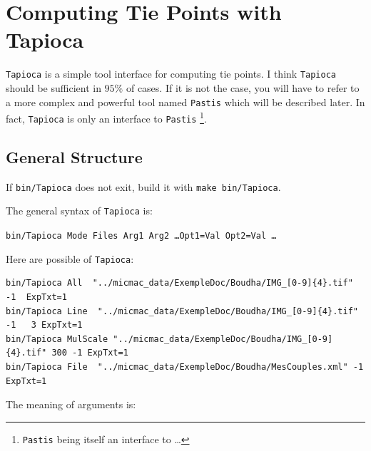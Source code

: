 \section{Computing Tie Points with Tapioca}

{\tt Tapioca} is a simple tool interface for computing tie points.
I think {\tt Tapioca}  should be sufficient in $95\%$ of cases.
If it is not the case, you will have to refer to a more complex and powerful
tool named {\tt Pastis} which will be described later.
In fact, {\tt Tapioca} is only an interface to {\tt Pastis}
\footnote{{\tt Pastis}  being itself an interface to \SiftPP \dots}.

\label{Tapioca}


\subsection{General Structure}

If {\tt bin/Tapioca} does not exit, build it with {\tt make bin/Tapioca}.

The general syntax of {\tt Tapioca} is:

\begin{center}
   {\tt bin/Tapioca   Mode  Files  Arg1 Arg2  \dots Opt1=Val Opt2=Val \dots}
\end{center}

Here are possible  of {\tt Tapioca}:

{\scriptsize
\begin{verbatim}
bin/Tapioca All  "../micmac_data/ExempleDoc/Boudha/IMG_[0-9]{4}.tif" -1  ExpTxt=1
bin/Tapioca Line  "../micmac_data/ExempleDoc/Boudha/IMG_[0-9]{4}.tif" -1   3 ExpTxt=1
bin/Tapioca MulScale "../micmac_data/ExempleDoc/Boudha/IMG_[0-9]{4}.tif" 300 -1 ExpTxt=1
bin/Tapioca File  "../micmac_data/ExempleDoc/Boudha/MesCouples.xml" -1  ExpTxt=1
\end{verbatim}
}


The meaning of arguments is:

